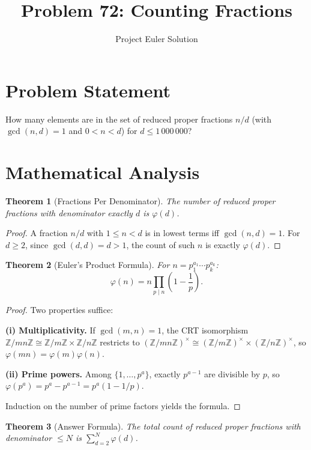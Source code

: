 \documentclass[12pt,a4paper]{article}
\title{Problem 72: Counting Fractions}
\author{Project Euler Solution}
\date{}
\newtheorem{theorem}{Theorem}
\begin{document}
\maketitle

\section{Problem Statement}

How many elements are in the set of reduced proper fractions $n/d$ (with $\gcd(n,d) = 1$ and $0 < n < d$) for $d \leq 1\,000\,000$?

\section{Mathematical Analysis}

\begin{theorem}[Fractions Per Denominator]
The number of reduced proper fractions with denominator exactly $d$ is $\varphi(d)$.
\end{theorem}

\begin{proof}
A fraction $n/d$ with $1 \leq n < d$ is in lowest terms iff $\gcd(n, d) = 1$. For $d \geq 2$, since $\gcd(d,d) = d > 1$, the count of such $n$ is exactly $\varphi(d)$.
\end{proof}

\begin{theorem}[Euler's Product Formula]
For $n = p_1^{a_1} \cdots p_k^{a_k}$:
\[
\varphi(n) = n \prod_{p \mid n} \left(1 - \frac{1}{p}\right).
\]
\end{theorem}

\begin{proof}
Two properties suffice:

\textbf{(i) Multiplicativity.} If $\gcd(m,n) = 1$, the CRT isomorphism $\mathbb{Z}/mn\mathbb{Z} \cong \mathbb{Z}/m\mathbb{Z} \times \mathbb{Z}/n\mathbb{Z}$ restricts to $(\mathbb{Z}/mn\mathbb{Z})^\times \cong (\mathbb{Z}/m\mathbb{Z})^\times \times (\mathbb{Z}/n\mathbb{Z})^\times$, so $\varphi(mn) = \varphi(m)\varphi(n)$.

\textbf{(ii) Prime powers.} Among $\{1, \ldots, p^a\}$, exactly $p^{a-1}$ are divisible by $p$, so $\varphi(p^a) = p^a - p^{a-1} = p^a(1 - 1/p)$.

Induction on the number of prime factors yields the formula.
\end{proof}

\begin{theorem}[Answer Formula]
The total count of reduced proper fractions with denominator $\leq N$ is $\sum_{d=2}^{N} \varphi(d)$.
\end{theorem}
\end{document}
